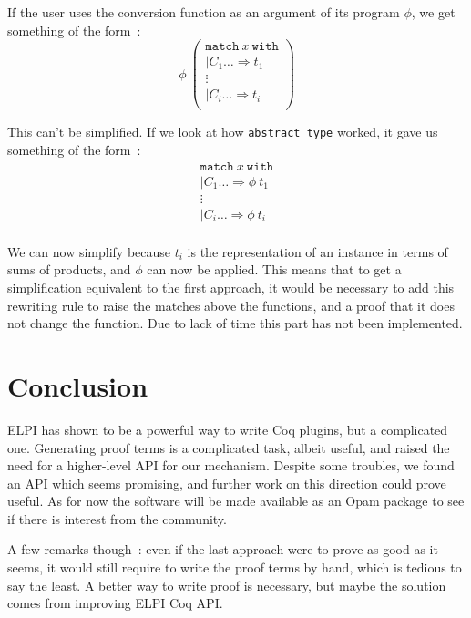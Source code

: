 \documentclass{article}
\begin{document}
If the user uses the conversion function as an argument of its program $\phi$,
we get something of the form~:
\[\phi\ \left(\begin{array}{l}
    \mathtt{match}\ x\ \mathtt{with}\\
    | C_1 \ldots \Rightarrow t_1 \\
    \vdots \\
    | C_i \ldots \Rightarrow t_i \\
\end{array}\right)\]

This can't be simplified. If we look at how \texttt{abstract\_type} worked,
it gave us something of the form~:
\[\begin{array}{l}
    \mathtt{match}\ x\ \mathtt{with}\\
    | C_1 \ldots \Rightarrow \phi\ t_1 \\
    \vdots \\
    | C_i \ldots \Rightarrow \phi\ t_i \\
\end{array}\]

We can now simplify because $t_i$ is the representation of an instance in terms
of sums of products, and $\phi$ can now be applied. This means that to get a
simplification equivalent to the first approach, it would be necessary to add
this rewriting rule to raise the matches above the functions, and a proof that
it does not change the function. Due to lack of time this part has not been
implemented.

\section{Conclusion}

ELPI has shown to be a powerful way to write Coq plugins, but a complicated
one. Generating proof terms is a complicated task, albeit useful, and raised
the need for a higher-level API for our mechanism. Despite some troubles,
we found an API which seems promising, and further work on this direction
could prove useful. As for now the software will be made available as an Opam
package to see if there is interest from the community.

A few remarks though~: even if the last approach were to prove as good as it seems,
it would still require to write the proof terms by hand, which is tedious to
say the least. A better way to write proof is necessary, but maybe the solution
comes from improving ELPI Coq API.

\newpage
{}


\end{document}
